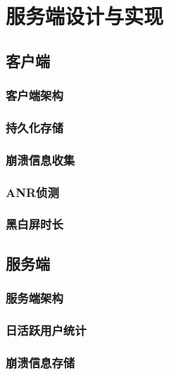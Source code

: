 
\chapter{服务端设计与实现}
\label{chap:design}

\section{客户端}

\subsection{客户端架构}

\subsection{持久化存储}

\subsection{崩溃信息收集}

\subsection{ANR侦测}

\subsection{黑白屏时长}



\section{服务端}

\subsection{服务端架构}

\subsection{日活跃用户统计}

\subsection{崩溃信息存储}


